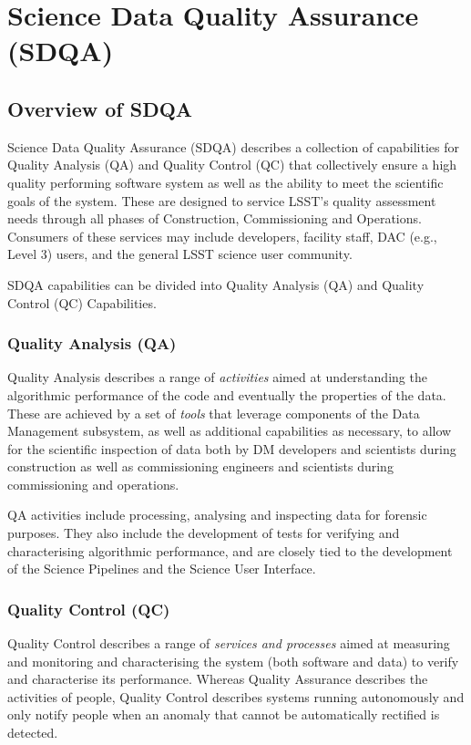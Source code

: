 \section{Science Data Quality Assurance (SDQA)}
\label{sec:sdqa}

\subsection{Overview of SDQA}

Science Data Quality Assurance (SDQA) describes a collection of
capabilities for Quality Analysis (QA) and Quality Control (QC) that
collectively ensure a high quality performing software system as well
as the ability to meet the scientific goals of the system. These are
designed to service LSST's quality assessment needs through all phases
of Construction, Commissioning and Operations. Consumers of these
services may include developers, facility staff, DAC (e.g., Level 3)
users, and the general LSST science user community.

SDQA capabilities can be divided into Quality Analysis (QA) and
Quality Control (QC) Capabilities.

\subsubsection{Quality Analysis (QA)}

Quality Analysis describes a range of \emph{activities} aimed at understanding the algorithmic performance of the code and eventually the properties of the data. These are achieved by a set of \emph{tools} that leverage components of the Data Management subsystem, as well as additional capabilities as necessary, to allow for the scientific inspection of data both by DM developers and scientists during construction as well as commissioning engineers and scientists during commissioning and operations.

QA activities include processing, analysing and inspecting data for forensic purposes. They also include the development of tests for verifying and characterising algorithmic performance, and are closely tied to the development of the Science Pipelines and the Science User Interface.

\subsubsection{Quality Control (QC)}

Quality Control describes a range of \emph{services and processes} aimed at measuring and monitoring and characterising the system (both software and data) to verify and characterise its performance. Whereas Quality Assurance describes the activities of people, Quality Control describes systems running autonomously and only notify people when an anomaly that cannot be automatically rectified is detected.

